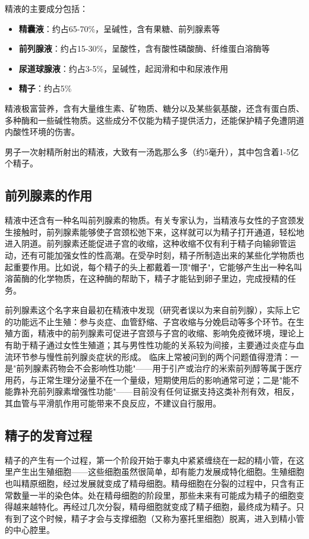 精液的主要成分包括：
\begin{itemize}
    \item \textbf{精囊液}：约占65-70\%，呈碱性，含有果糖、前列腺素等
    \item \textbf{前列腺液}：约占15-30\%，呈酸性，含有酸性磷酸酶、纤维蛋白溶酶等
    \item \textbf{尿道球腺液}：约占3-5\%，呈碱性，起润滑和中和尿液作用
    \item \textbf{精子}：约占5\%
\end{itemize}

精液极富营养，含有大量维生素、矿物质、糖分以及某些氨基酸，还含有蛋白质、多种酶和一些碱性物质。这些成分不仅能为精子提供活力，还能保护精子免遭阴道内酸性环境的伤害。

男子一次射精所射出的精液，大致有一汤匙那么多（约5毫升），其中包含着1-5亿个精子。

\subsection{前列腺素的作用}

精液中还含有一种名叫前列腺素的物质。有关专家认为，当精液与女性的子宫颈发生接触时，前列腺素能够使子宫颈松弛下来，这样就可以为精子打开通道，轻松地进入阴道。前列腺素还能促进子宫的收缩，这种收缩不仅有利于精子向输卵管运动，还有可能加强女性的性高潮。在受孕时刻，精子所制造出来的某些化学物质也起重要作用。比如说，每个精子的头上都戴着一顶"帽子"，它能够产生出一种名叫溶菌酶的化学物质，在这种酶的帮助下，精子才能钻到卵子里边，完成授精的任务。


前列腺素这个名字来自最初在精液中发现（研究者误以为来自前列腺），实际上它的功能远不止生殖：参与炎症、血管舒缩、子宫收缩与分娩启动等多个环节。在生殖方面，精液中的前列腺素可促进子宫颈与子宫的收缩、影响免疫微环境，理论上有助于精子通过女性生殖道；其与男性性功能的关系较为间接，主要通过炎症与血流环节参与慢性前列腺炎症状的形成。
临床上常被问到的两个问题值得澄清：一是"前列腺素药物会不会影响性功能"——用于引产或治疗的米索前列醇等属于医疗用药，与正常生理分泌量不在一个量级，短期使用后的影响通常可逆；二是"能不能靠补充前列腺素增强性功能"——目前没有任何证据支持这类补剂有效，相反，其血管与平滑肌作用可能带来不良反应，不建议自行服用。

\subsection{精子的发育过程}

精子的产生有一个过程，第一个阶段开始于睾丸中紧紧缠绕在一起的精小管，在这里产生出生殖细胞——这些细胞虽然很简单，却有能力发展成特化细胞。生殖细胞也叫精原细胞，经过发展就变成了精母细胞。精母细胞在分裂的过程中，只含有正常数量一半的染色体。处在精母细胞的阶段里，那些未来有可能成为精子的细胞变得越来越特化。再经过几次分裂，精母细胞就变成了精子细胞，最终成为精子。只有到了这个时候，精子才会与支撑细胞（又称为塞托里细胞）脱离，进入到精小管的中心腔里。

